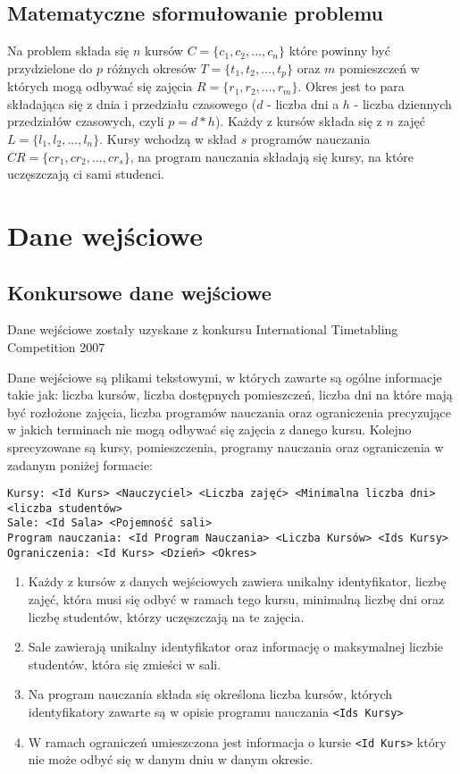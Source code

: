 \subsection{Matematyczne sformułowanie problemu} \cite{tabu}
\par Na problem składa się ${n}$ kursów ${C = \{c_{1}, c_{2},...,c_{n}\}}$ które powinny być przydzielone do ${p}$ różnych okresów ${T = \{t_{1}, t_{2},...,t_{p}\}}$ oraz ${m}$ pomieszczeń w których mogą odbywać się zajęcia ${R = \{r_{1}, r_{2},...,r_{m}\}}$. Okres jest to para składająca się z dnia i przedziału czasowego (${d}$ - liczba dni a ${h}$ - liczba dziennych przedziałów czasowych, czyli ${p = d * h}$). Każdy z kursów składa się z ${n}$ zajęć ${L = \{l_{1},l_{2},...,l_{n}\}}$. Kursy wchodzą w skład ${s}$ programów nauczania ${CR = \{cr_{1}, cr_{2}, ..., cr_{s}\}}$, na program nauczania składają się kursy, na które uczęszczają ci sami studenci. 

\section{Dane wejściowe}
\subsection{Konkursowe dane wejściowe}
\par Dane wejściowe zostały uzyskane z konkursu International Timetabling Competition 2007
\par Dane wejściowe są plikami tekstowymi, w których zawarte są ogólne informacje takie jak: liczba kursów, liczba dostępnych pomieszczeń, liczba dni na które mają być rozłożone zajęcia, liczba programów nauczania oraz ograniczenia precyzujące w jakich terminach nie mogą odbywać się zajęcia z danego kursu. Kolejno sprecyzowane są kursy, pomieszczenia, programy nauczania oraz ograniczenia w zadanym poniżej formacie:
\begin{verbatim}
Kursy: <Id Kurs> <Nauczyciel> <Liczba zajęć> <Minimalna liczba dni> <liczba studentów>
Sale: <Id Sala> <Pojemność sali>
Program nauczania: <Id Program Nauczania> <Liczba Kursów> <Ids Kursy>
Ograniczenia: <Id Kurs> <Dzień> <Okres>
\end{verbatim}
\begin{enumerate}
\item Każdy z kursów z danych wejściowych zawiera unikalny identyfikator, liczbę zajęć, która musi się odbyć w ramach tego kursu, minimalną liczbę dni oraz liczbę studentów, którzy uczęszczają na te zajęcia. 
\item Sale zawierają unikalny identyfikator oraz informację o maksymalnej liczbie studentów, która się zmieści w sali.
\item Na program nauczania składa się określona liczba kursów, których identyfikatory zawarte są w opisie programu nauczania  \verb#<Ids Kursy>#

\item W ramach ograniczeń umieszczona jest informacja o kursie \verb#<Id Kurs>#
 który nie może odbyć się w danym dniu w danym okresie.
\end{enumerate}
